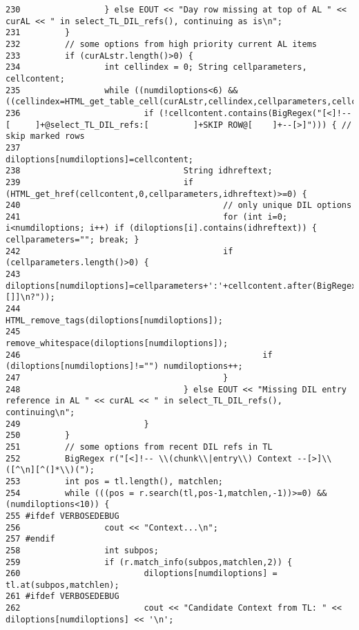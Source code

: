 \begin{verbatim}
230                 } else EOUT << "Day row missing at top of AL " << curAL << " in select_TL_DIL_refs(), continuing as is\n";
231         }
232         // some options from high priority current AL items
233         if (curALstr.length()>0) {
234                 int cellindex = 0; String cellparameters, cellcontent;
235                 while ((numdiloptions<6) && ((cellindex=HTML_get_table_cell(curALstr,cellindex,cellparameters,cellcontent))>=0))
236                         if (!cellcontent.contains(BigRegex("[<]!--[     ]+@select_TL_DIL_refs:[         ]+SKIP ROW@[    ]+--[>]"))) { // skip marked rows
237                                 diloptions[numdiloptions]=cellcontent;
238                                 String idhreftext;
239                                 if (HTML_get_href(cellcontent,0,cellparameters,idhreftext)>=0) {
240                                         // only unique DIL options
241                                         for (int i=0; i<numdiloptions; i++) if (diloptions[i].contains(idhreftext)) { cellparameters=""; break; }
242                                         if (cellparameters.length()>0) {
243                                                 diloptions[numdiloptions]=cellparameters+':'+cellcontent.after(BigRegex("[]]\n?"));
244                                                 HTML_remove_tags(diloptions[numdiloptions]);
245                                                 remove_whitespace(diloptions[numdiloptions]);
246                                                 if (diloptions[numdiloptions]!="") numdiloptions++;
247                                         }
248                                 } else EOUT << "Missing DIL entry reference in AL " << curAL << " in select_TL_DIL_refs(), continuing\n";
249                         }
250         }
251         // some options from recent DIL refs in TL
252         BigRegex r("[<]!-- \\(chunk\\|entry\\) Context --[>]\\([^\n][^(]*\\)(");
253         int pos = tl.length(), matchlen;
254         while (((pos = r.search(tl,pos-1,matchlen,-1))>=0) && (numdiloptions<10)) {
255 #ifdef VERBOSEDEBUG
256                 cout << "Context...\n";
257 #endif
258                 int subpos;
259                 if (r.match_info(subpos,matchlen,2)) {
260                         diloptions[numdiloptions] = tl.at(subpos,matchlen);
261 #ifdef VERBOSEDEBUG
262                         cout << "Candidate Context from TL: " << diloptions[numdiloptions] << '\n';

\end{verbatim}
